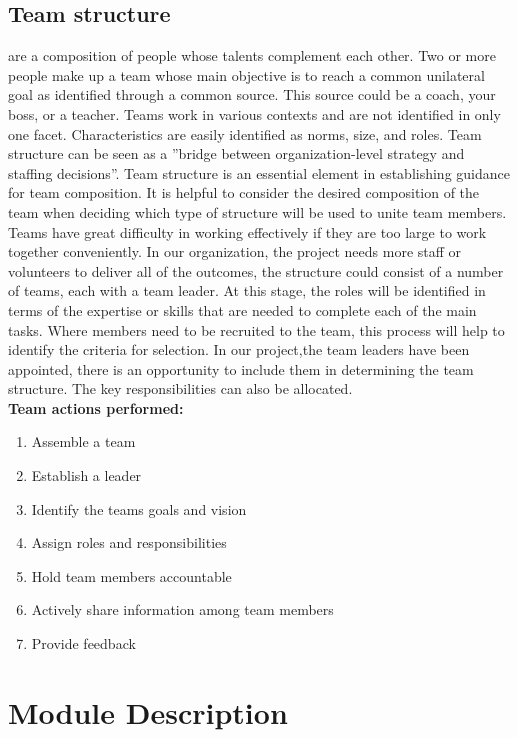 \documentclass{SureshLimkar}
\begin{document}
\subsection{Team structure}
\hspace{0.5 in} are a composition of people whose talents complement each other. Two or more people make up a team whose main objective is to reach a common unilateral goal as identified through a common source. This source could be a coach, your boss, or a teacher. Teams work in various contexts and are not identified in only one facet. Characteristics are easily
identified as norms, size, and roles. 
\hspace{0.5 in}Team structure can be seen as a ”bridge between organization-level strategy
and staffing decisions”. Team structure is an essential element in establishing guidance for team composition. It is helpful to consider the desired composition of the team when deciding which type of structure will be used to unite team members. Teams have great difficulty in working
effectively if they are too large to work together conveniently. In our organization, the project needs more staff or volunteers to deliver all of the outcomes, the structure could consist of a number of teams, each with a team leader.
\hspace{0.5 in}At this stage, the roles will be identified in terms of the expertise or skills that are needed to complete each of the main tasks. Where members need to be recruited to the team, this process will help to identify the criteria for selection. In our project,the team leaders have been appointed, there is an opportunity to include them in determining the team structure. The key responsibilities can also be allocated.
\\
\hspace{0.5 in}\textbf{Team actions performed:}\\
\begin{enumerate}
\item Assemble a team
\item Establish a leader
\item Identify the teams goals and vision
\item Assign roles and responsibilities
\item Hold team members accountable
\item Actively share information among team members
\item Provide feedback
\end{enumerate}
\newpage
\section{Module Description}
\end{document}

